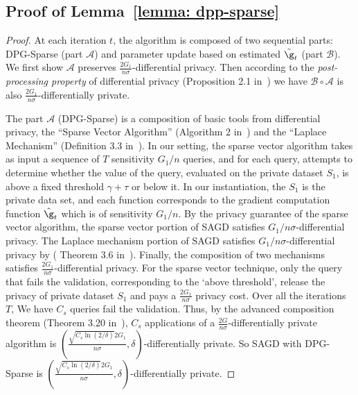 \subsection{Proof of Lemma~\ref{lemma: dpp-sparse}}

\lemdppsparse*

\begin{proof}
At each iteration $t$, the algorithm is composed of two sequential parts: DPG-Sparse (part $\mathcal{A}$) and parameter update based on estimated $\tilde \g_t$ (part $\mathcal{B}$).
We first show $\mathcal{A}$ preserves $\frac{2G_1}{n\sigma}$-differential privacy. Then according to the \emph{post-processing property} of differential privacy (Proposition 2.1 in~\cite{dwro2014}) we have $\mathcal{B} \circ \mathcal{A}$ is also $\frac{2G_1}{n\sigma}$-differentially private.
	
The part $\mathcal{A}$ (DPG-Sparse) is a composition of basic tools from differential privacy, the ``Sparse Vector Algorithm'' (Algorithm 2 in~\citep{dwro2014}) and the ``Laplace Mechanism'' (Definition 3.3 in~\citep{dwro2014}). In our setting, the sparse vector algorithm takes as input a sequence of $T$ sensitivity $G_1/n$ queries, and for each query, attempts to determine whether the value of the query, evaluated on the private dataset $S_1$, is above a fixed threshold $\gamma + \tau$ or below it. In our instantiation, the  $S_1$ is the private data set, and each function corresponds to the gradient computation function $ \hat \g_t$ which is of sensitivity $G_1/n$. 
By the privacy guarantee of the sparse vector algorithm, the sparse vector portion of SAGD satisfies $G_1/n\sigma$-differential privacy. The Laplace mechanism portion of SAGD
satisfies $G_1/n\sigma$-differential privacy by ( Theorem 3.6 in~\cite{dwro2014}). Finally, the composition of two mechanisms satisfies $\frac{2G_1}{n\sigma}$-differential privacy. For the sparse vector technique, only the query that fails the validation, corresponding to the `above threshold', release the privacy
of private dataset $S_1$ and pays a $\frac{2G_1}{n\sigma}$ privacy cost. 
Over all the iterations $T$, We have $C_{s}$ queries fail the validation.
Thus, by the advanced composition theorem (Theorem 3.20 in~\cite{dwro2014}), $C_{s}$ applications of a $\frac{2G}{n\sigma}$-differentially private algorithm is  $(\frac{\sqrt{C_{s} \ln(2/\delta)} 2G_1}{n\sigma}, \delta)$-differentially private. So SAGD with DPG-Sparse is $(\frac{\sqrt{C_{s} \ln(2/\delta)} 2G_1}{n\sigma}, \delta)$-differentially private.
\end{proof}
    


